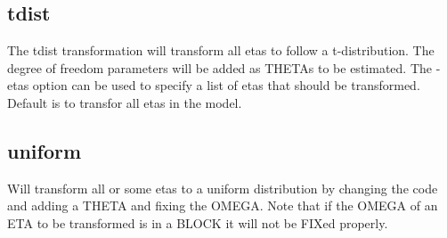 \subsection{tdist}
The tdist transformation will transform all etas to follow a t-distribution. The degree of freedom parameters will be added as THETAs to be estimated. The -etas option can be used to specify a list of etas that should be transformed. Default is to transfor all etas in the model.

\subsection{uniform}
Will transform all or some etas to a uniform distribution by changing the code and adding a THETA and fixing the OMEGA. Note that if the OMEGA of an ETA to be transformed is in a BLOCK it will not be FIXed properly.


